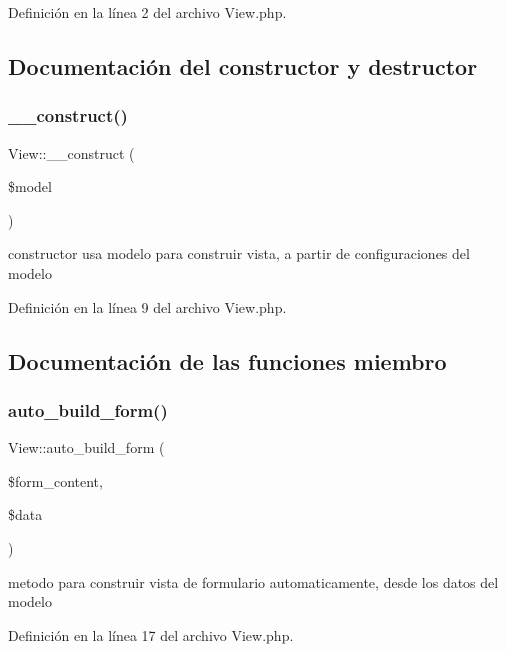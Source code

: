 Definición en la línea 2 del archivo View.\+php.



\subsection{Documentación del constructor y destructor}
\mbox{\label{class_view_a946a646ca1bb866acdbde73a28f33993}} 
\subsubsection{\texorpdfstring{\_\_construct()}{\_\_construct()}}
{\footnotesize\ttfamily View\+::\+\_\+\+\_\+construct (\begin{DoxyParamCaption}\item[{}]{\$model }\end{DoxyParamCaption})}

constructor usa modelo para construir vista, a partir de configuraciones del modelo 

Definición en la línea 9 del archivo View.\+php.



\subsection{Documentación de las funciones miembro}
\mbox{\label{class_view_a450c3cc299b4e42b3e6499b783a3ad6d}} 
\subsubsection{\texorpdfstring{auto\_build\_form()}{auto\_build\_form()}}
{\footnotesize\ttfamily View\+::auto\+\_\+build\+\_\+form (\begin{DoxyParamCaption}\item[{}]{\$form\+\_\+content,  }\item[{}]{\$data }\end{DoxyParamCaption})}

metodo para construir vista de formulario automaticamente, desde los datos del modelo 

Definición en la línea 17 del archivo View.\+php.

\mbox{\label{class_view_a8ab136103e7ca8c850c409e2b7dd92e2}} 
